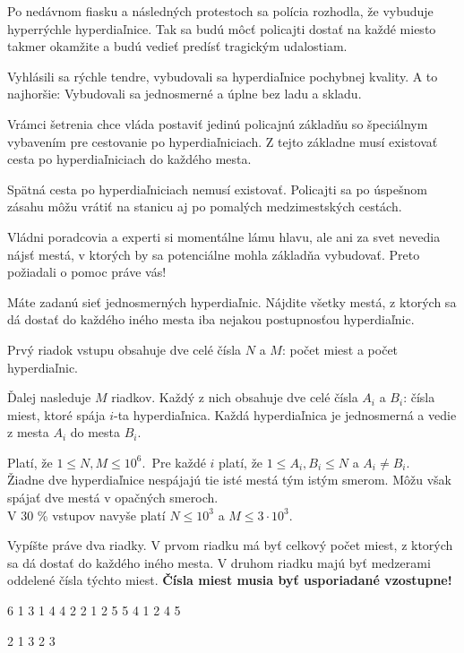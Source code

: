 
\usepackage[slovak]{babel}





Po nedávnom fiasku a následných protestoch sa polícia rozhodla, že vybuduje
hyperrýchle hyperdiaľnice. Tak sa budú môcť policajti dostať na každé miesto takmer
okamžite a budú vedieť predísť tragickým udalostiam.

Vyhlásili sa rýchle tendre, vybudovali sa hyperdiaľnice pochybnej kvality. A to
najhoršie: Vybudovali sa jednosmerné a úplne bez ladu a skladu.

Vrámci šetrenia chce vláda postaviť jedinú policajnú základňu so špeciálnym
vybavením pre cestovanie po hyperdiaľniciach. Z tejto základne musí existovať
cesta po hyperdiaľniciach do každého mesta.

Spätná cesta po hyperdiaľniciach nemusí existovať. Policajti sa po úspešnom
zásahu môžu vrátiť na stanicu aj po pomalých medzimestských cestách.

Vládni poradcovia a experti si momentálne lámu hlavu, ale ani za svet nevedia
nájsť mestá, v ktorých by sa potenciálne mohla základňa vybudovať. Preto požiadali
o pomoc práve vás!


Máte zadanú sieť jednosmerných hyperdiaľnic. Nájdite všetky mestá, z ktorých
sa dá dostať do každého iného mesta iba nejakou postupnosťou hyperdiaľnic.


Prvý riadok vstupu obsahuje dve celé čísla $N$ a $M$: počet miest a počet
hyperdiaľnic.

Ďalej nasleduje $M$ riadkov. Každý z nich obsahuje dve celé čísla $A_i$ a $B_i$:
čísla miest, ktoré spája $i$-ta hyperdiaľnica. Každá hyperdiaľnica je jednosmerná a vedie
z mesta $A_i$ do mesta $B_i$.

\bigskip
\noindent
Platí, že $1 \leq N, M \leq 10^6$.\
Pre každé $i$ platí, že $1 \leq A_i, B_i \leq N$ a $A_i \neq B_i$.\\
Žiadne dve hyperdiaľnice nespájajú tie isté mestá tým istým smerom. Môžu však
spájať dve mestá v opačných smeroch. \\
V 30 \% vstupov navyše platí $N \leq 10^3$ a $M \leq 3 \cdot 10^3$.


Vypíšte práve dva riadky. V prvom riadku má byť celkový počet miest, z ktorých
sa dá dostať do každého iného mesta. V druhom riadku majú byť medzerami oddelené
čísla týchto miest. \textbf{Čísla miest musia byť usporiadané vzostupne!}


 6
1 3
1 4
4 2
2 1
2 5
5 4
1 2 4 5
\sampleEND

 2
1 3
2 3
~
\sampleEND


